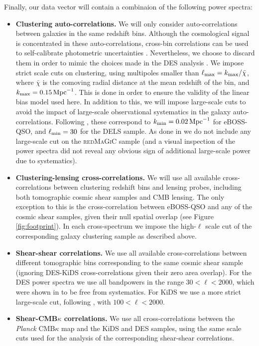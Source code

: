 \documentclass[a4paper,11pt]{article}
\newcommand{\cmbk}{CMB$\kappa$\xspace}
\newcommand{\des}{DES\xspace}
\newcommand{\kids}{KiDS\xspace}
\newcommand{\planck}{{\sl Planck}\xspace}
\newcommand{\eboss}{eBOSS-QSO\xspace}
\newcommand{\redmagic}{\textsc{redMaGiC}\xspace}
\newcommand{\dls}{DELS\xspace}
\begin{document}
      Finally, our data vector will contain a combinaion of the following power spectra:
      \begin{itemize}
        \item {\bf Clustering auto-correlations.} We will only consider auto-correlations between galaxies in the same redshift bins. Although the cosmological signal is concentrated in these auto-correlations, cross-bin correlations can be used to self-calibrate photometric uncertainties \cite{1912.08209,2010.00466}. Nevertheless, we choose to discard them in order to mimic the choices made in the \des analysis \cite{1708.01530}. We impose strict scale cuts on clustering, using multipoles smaller than $\ell_{\rm max}=k_{\rm max}/\bar{\chi}$, where $\bar{\chi}$ is the comoving radial distance at the mean redshift of the bin, and $k_{\rm max}=0.15\,{\rm Mpc}^{-1}$. This is done in order to ensure the validity of the linear bias model used here. In addition to this, we will impose large-scale cuts to avoid the impact of large-scale observational systematics in the galaxy auto-correlations. Following \cite{2007.08999,2010.00466}, these correspond to $k_{\rm min}=0.02\,{\rm Mpc}^{-1}$ for \eboss, and $\ell_{\rm min}=30$ for the \dls sample. As done in \cite{1708.01536} we do not include any large-scale cut on the \redmagic sample (and a visual inspection of the power spectra did not reveal any obvious sign of additional large-scale power due to systematics).
        \item {\bf Clustering-lensing cross-correlations.} We will use all available cross-correlations between clustering redshift bins and lensing probes, including both tomographic cosmic shear samples and CMB lensing. The only exception to this is the cross-correlation between \eboss and any of the cosmic shear samples, given their null spatial overlap (see Figure \ref{fig:footprint}). In each cross-spectrum we impose the high-$\ell$ scale cut of the corresponding galaxy clustering sample as described above. 
        \item {\bf Shear-shear correlations.} We use all available cross-correlations between different tomographic bins corresponding to the same cosmic shear sample (ignoring \des-\kids cross-correlations given their zero area overlap). For the \des power spectra we use all bandpowers in the range $30<\ell<2000$, which were shown in \cite{2010.09717} to be free from systematics. For \kids we use a more strict large-scale cut, following \cite{2007.15633,2007.15632}, with $100<\ell<2000$.
        \item {\bf Shear-\cmbk correlations.} We use all cross-correlations between the \planck \cmbk map and the \kids and \des samples, using the same scale cuts used for the analysis of the corresponding shear-shear correlations.
      \end{itemize}
      
\end{document}
